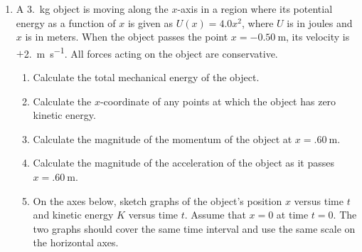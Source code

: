 \documentclass{../../../oss-classkick}
\begin{document}
\begin{enumerate}[leftmargin=15pt]
\item A \SI{3.}{\kilo\gram} object is moving along the $x$-axis in a region
  where its potential energy as a function of $x$ is given as $U(x)=4.0x^2$,
  where $U$ is in joules and $x$ is in meters. When the object passes the point
  $x=\SI{-0.50}{\metre}$, its velocity is $+$\SI{2.}{\metre\per\second}. All
  forces acting on the object are conservative.
  \begin{enumerate}[leftmargin=18pt]

  \item Calculate the total mechanical energy of the object.
  \item Calculate the $x$-coordinate of any points at which the object has zero
    kinetic energy.
  \item Calculate the magnitude of the momentum of the object at
    $x=\SI{.60}{\metre}$.
  \item Calculate the magnitude of the acceleration of the object as it passes
    $x=\SI{.60}{\metre}$.
  \item On the axes below, sketch graphs of the object's position $x$ versus
    time $t$ and kinetic energy $K$ versus time $t$. Assume that $x=0$ at time
    $t=0$. The two graphs should cover the same time interval and use the same
    scale on the horizontal axes.
    \begin{center}
      \vspace{.2in}
    \end{center}
  \end{enumerate}
  
  \newpage
  

\end{enumerate}
\end{document}

